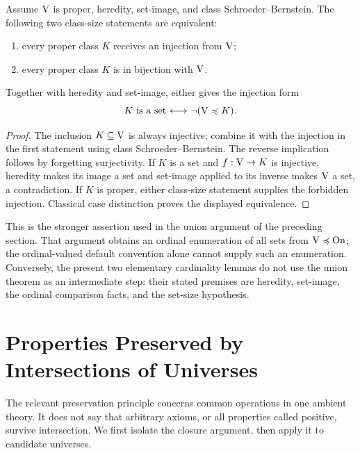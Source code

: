 \begin{proposition}
Assume $\mathrm{V}$ is proper, heredity, set-image, and class
Schroeder--Bernstein. The following two class-size statements are equivalent:
\begin{enumerate}
\item every proper class $K$ receives an injection from $\mathrm{V}$;
\item every proper class $K$ is in bijection with $\mathrm{V}$.
\end{enumerate}
Together with heredity and set-image, either gives the injection form
\[
K\text{ is a set}{\ \longleftrightarrow\ }\neg(\mathrm{V}\preccurlyeq K).
\]
\end{proposition}
\begin{proof}
The inclusion $K\subseteq\mathrm{V}$ is always injective; combine it with the
injection in the first statement using class Schroeder--Bernstein.
The reverse implication follows by forgetting surjectivity.
If $K$ is a set and $f:\mathrm{V}\to K$ is injective, heredity makes its image
a set and set-image applied to its inverse makes $\mathrm{V}$ a set, a
contradiction. If $K$ is proper, either class-size statement supplies
the forbidden injection. Classical case distinction proves the displayed
equivalence.
\end{proof}

This is the stronger assertion used in the union argument of the preceding
section. That argument obtains an ordinal enumeration of all sets from
$\mathrm{V}\preccurlyeq\mathrm{On}$; the ordinal-valued default convention alone cannot
supply such an enumeration. Conversely, the present two elementary
cardinality lemmas do not use the union theorem as an intermediate step:
their stated premises are heredity, set-image, the ordinal comparison
facts, and the set-size hypothesis.

\pagebreak
\section{Properties Preserved by Intersections of Universes}
\label{sec:properties_preserved_intersections}
The relevant preservation principle concerns common operations in one
ambient theory. It does not say that arbitrary axioms, or all properties
called positive, survive intersection. We first isolate the closure
argument, then apply it to candidate universes.

